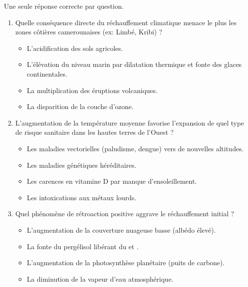 \documentclass[11pt]{article}
\begin{document}
\begin{exercice}
\label{exo:qcm}
Une seule réponse correcte par question.
\begin{enumerate}
    \item Quelle conséquence directe du réchauffement climatique menace le plus les zones côtières camerounaises (ex: Limbé, Kribi) ?
    \begin{itemize}
        \item[A] L'acidification des sols agricoles.
        \item[B] L'élévation du niveau marin par dilatation thermique et fonte des glaces continentales.
        \item[C] La multiplication des éruptions volcaniques.
        \item[D] La disparition de la couche d'ozone.
    \end{itemize}
    \item L'augmentation de la température moyenne favorise l'expansion de quel type de risque sanitaire dans les hautes terres de l'Ouest ?
    \begin{itemize}
        \item[A] Les maladies vectorielles (paludisme, dengue) vers de nouvelles altitudes.
        \item[B] Les maladies génétiques héréditaires.
        \item[C] Les carences en vitamine D par manque d'ensoleillement.
        \item[D] Les intoxications aux métaux lourds.
    \end{itemize}
    \item Quel phénomène de rétroaction positive aggrave le réchauffement initial ?
    \begin{itemize}
        \item[A] L'augmentation de la couverture nuageuse basse (albédo élevé).
        \item[B] La fonte du pergélisol libérant du  et .
        \item[C] L'augmentation de la photosynthèse planétaire (puits de carbone).
        \item[D] La diminution de la vapeur d'eau atmosphérique.
    \end{itemize}
\end{enumerate}
\end{exercice}
\end{document}
